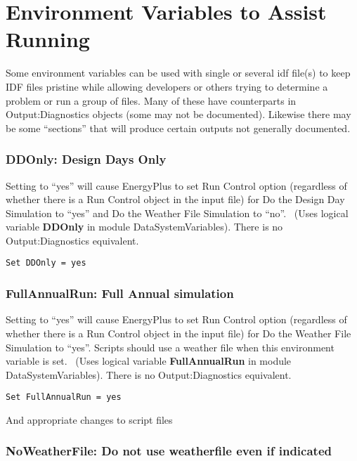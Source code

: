 \section{Environment Variables to Assist Running}\label{environment-variables-to-assist-running}

Some environment variables can be used with single or several idf file(s) to keep IDF files pristine while allowing developers or others trying to determine a problem or run a group of files. Many of these have counterparts in Output:Diagnostics objects (some may not be documented). Likewise there may be some ``sections'' that will produce certain outputs not generally documented.

\subsubsection{DDOnly: Design Days Only}\label{ddonly-design-days-only}

Setting to ``yes'' will cause EnergyPlus to set Run Control option (regardless of whether there is a Run Control object in the input file) for Do the Design Day Simulation to ``yes'' and Do the Weather File Simulation to ``no''.~ (Uses logical variable \textbf{DDOnly} in module DataSystemVariables). There is no Output:Diagnostics equivalent.

\begin{lstlisting}
Set DDOnly = yes
\end{lstlisting}

\subsubsection{FullAnnualRun: Full Annual simulation}\label{fullannualrun-full-annual-simulation}

Setting to ``yes'' will cause EnergyPlus to set Run Control option (regardless of whether there is a Run Control object in the input file) for Do the Weather File Simulation to ``yes''. Scripts should use a weather file when this environment variable is set.~ (Uses logical variable \textbf{FullAnnualRun} in module DataSystemVariables). There is no Output:Diagnostics equivalent.

\begin{lstlisting}
Set FullAnnualRun = yes
\end{lstlisting}

And appropriate changes to script files

\subsubsection{NoWeatherFile: Do not use weatherfile even if indicated}\label{noweatherfile-do-not-use-weatherfile-even-if-indicated}

